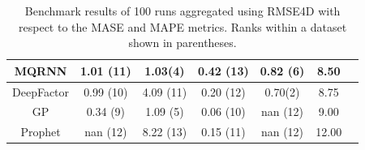 \begin{table}[htb]
\begin{tabular}{ccccccc}
    MQRNN       & \cellcolor{red!50} 1.01 (11)  & 1.03(4) \cellcolor{green!30}  & \cellcolor{red!70} 0.42 (13)  & 0.82 (6)                      & 8.50                \\\hline
    DeepFactor  & \cellcolor{red!30} 0.99 (10)  & \cellcolor{red!30} 4.09 (11)  & \cellcolor{red!50} 0.20 (12)  & 0.70(2) \cellcolor{green!70}  & 8.75                \\\hline
    GP          & 0.34 (9)                      & 1.09 (5)                      & \cellcolor{red!10} 0.06 (10)  & \cellcolor{red!70} nan (12)   & 9.00                \\\hline
    Prophet     & \cellcolor{red!70} nan (12)   & \cellcolor{red!70} 8.22 (13)  & \cellcolor{red!30} 0.15 (11)  & \cellcolor{red!70} nan (12)   & 12.00               \\\hline
  \end{tabular}
  \caption{Benchmark results of 100 runs aggregated using RMSE4D with respect to the MASE and MAPE metrics. Ranks within a dataset shown in parentheses.}
  \label{tab:benchmark_results_MASE_MAPE}
\end{table}


